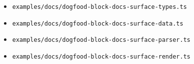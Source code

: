 \begin{itemize}
  \begin{itemize}
  \tightlist
  \item
    \texttt{e\allowbreak{}x\allowbreak{}a\allowbreak{}m\allowbreak{}p\allowbreak{}l\allowbreak{}e\allowbreak{}s\allowbreak{}/\allowbreak{}d\allowbreak{}o\allowbreak{}c\allowbreak{}s\allowbreak{}/\allowbreak{}d\allowbreak{}o\allowbreak{}g\allowbreak{}f\allowbreak{}o\allowbreak{}o\allowbreak{}d\allowbreak{}-\allowbreak{}b\allowbreak{}l\allowbreak{}o\allowbreak{}c\allowbreak{}k\allowbreak{}-\allowbreak{}d\allowbreak{}o\allowbreak{}c\allowbreak{}s\allowbreak{}-\allowbreak{}s\allowbreak{}u\allowbreak{}r\allowbreak{}f\allowbreak{}a\allowbreak{}c\allowbreak{}e\allowbreak{}-\allowbreak{}t\allowbreak{}y\allowbreak{}p\allowbreak{}e\allowbreak{}s\allowbreak{}.\allowbreak{}t\allowbreak{}s}
  \item
    \texttt{e\allowbreak{}x\allowbreak{}a\allowbreak{}m\allowbreak{}p\allowbreak{}l\allowbreak{}e\allowbreak{}s\allowbreak{}/\allowbreak{}d\allowbreak{}o\allowbreak{}c\allowbreak{}s\allowbreak{}/\allowbreak{}d\allowbreak{}o\allowbreak{}g\allowbreak{}f\allowbreak{}o\allowbreak{}o\allowbreak{}d\allowbreak{}-\allowbreak{}b\allowbreak{}l\allowbreak{}o\allowbreak{}c\allowbreak{}k\allowbreak{}-\allowbreak{}d\allowbreak{}o\allowbreak{}c\allowbreak{}s\allowbreak{}-\allowbreak{}s\allowbreak{}u\allowbreak{}r\allowbreak{}f\allowbreak{}a\allowbreak{}c\allowbreak{}e\allowbreak{}-\allowbreak{}d\allowbreak{}a\allowbreak{}t\allowbreak{}a\allowbreak{}.\allowbreak{}t\allowbreak{}s}
  \item
    \texttt{e\allowbreak{}x\allowbreak{}a\allowbreak{}m\allowbreak{}p\allowbreak{}l\allowbreak{}e\allowbreak{}s\allowbreak{}/\allowbreak{}d\allowbreak{}o\allowbreak{}c\allowbreak{}s\allowbreak{}/\allowbreak{}d\allowbreak{}o\allowbreak{}g\allowbreak{}f\allowbreak{}o\allowbreak{}o\allowbreak{}d\allowbreak{}-\allowbreak{}b\allowbreak{}l\allowbreak{}o\allowbreak{}c\allowbreak{}k\allowbreak{}-\allowbreak{}d\allowbreak{}o\allowbreak{}c\allowbreak{}s\allowbreak{}-\allowbreak{}s\allowbreak{}u\allowbreak{}r\allowbreak{}f\allowbreak{}a\allowbreak{}c\allowbreak{}e\allowbreak{}-\allowbreak{}p\allowbreak{}a\allowbreak{}r\allowbreak{}s\allowbreak{}e\allowbreak{}r\allowbreak{}.\allowbreak{}t\allowbreak{}s}
  \item
    \texttt{e\allowbreak{}x\allowbreak{}a\allowbreak{}m\allowbreak{}p\allowbreak{}l\allowbreak{}e\allowbreak{}s\allowbreak{}/\allowbreak{}d\allowbreak{}o\allowbreak{}c\allowbreak{}s\allowbreak{}/\allowbreak{}d\allowbreak{}o\allowbreak{}g\allowbreak{}f\allowbreak{}o\allowbreak{}o\allowbreak{}d\allowbreak{}-\allowbreak{}b\allowbreak{}l\allowbreak{}o\allowbreak{}c\allowbreak{}k\allowbreak{}-\allowbreak{}d\allowbreak{}o\allowbreak{}c\allowbreak{}s\allowbreak{}-\allowbreak{}s\allowbreak{}u\allowbreak{}r\allowbreak{}f\allowbreak{}a\allowbreak{}c\allowbreak{}e\allowbreak{}-\allowbreak{}r\allowbreak{}e\allowbreak{}n\allowbreak{}d\allowbreak{}e\allowbreak{}r\allowbreak{}.\allowbreak{}t\allowbreak{}s}

\end{itemize}
\end{itemize}

